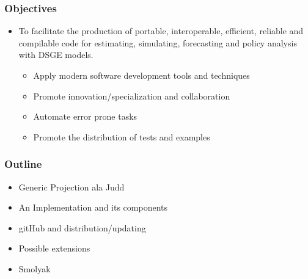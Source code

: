 \documentclass[handout]{beamer}
\begin{document}
\begin{frame}
  \frametitle{Objectives}  

{%
\begin{itemize}
\item To facilitate  
the production of  portable, interoperable, efficient, 
 reliable and compilable code  for estimating,  
simulating,  forecasting and  policy analysis with
DSGE models.
  \begin{itemize}
  \item Apply modern software development tools and techniques
  \item Promote innovation/specialization and collaboration 
  \item Automate error prone tasks
  \item Promote the distribution of tests and examples
  \end{itemize}
\end{itemize}
}
\end{frame}


\begin{frame}
  \frametitle{Outline}
  \begin{itemize}
  \item Generic Projection ala Judd
  \item An Implementation  and its components

  \item gitHub and distribution/updating
  \item Possible extensions

  \item Smolyak
  \end{itemize}
\end{frame}
\end{document}
